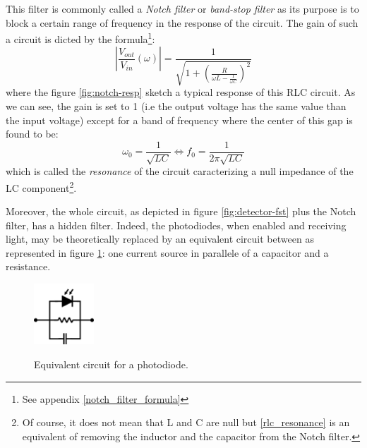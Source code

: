 \documentclass[11pt]{report}
\begin{document}
This filter is commonly called a \textit{Notch filter} or \textit{band-stop filter} as its purpose is to block a certain range of frequency in the response of the circuit. The gain of such a circuit is dicted by the formula\footnote{See appendix \ref{notch_filter_formula}}:
\begin{equation}
\left\lvert \frac{V_{out}}{V_{in}} (\omega) \right\rvert = \frac{1}{\sqrt{1 + \left(\frac{R}{\omega L - \frac{1}{\omega C}}\right)^2}}
\end{equation}
where the figure \ref{fig:notch-resp} sketch a typical response of this RLC circuit. As we can see, the gain is set to 1 (i.e the output voltage has the same value than the input voltage) except for a band of frequency where the center of this gap is found to be:
\begin{equation}
\label{rlc_resonance}
\omega_0 = \frac{1}{\sqrt{LC}} \Leftrightarrow f_0 = \frac{1}{2\pi\sqrt{LC}}
\end{equation}
which is called the \textit{resonance} of the circuit caracterizing a null impedance of the LC component\footnote{Of course, it does not mean that L and C are null but \eqref{rlc_resonance} is an equivalent of removing the inductor and the capacitor from the Notch filter.}.

Moreover, the whole circuit, as depicted in figure \ref{fig:detector-fst} plus the Notch filter, has a hidden filter. Indeed, the photodiodes, when enabled and receiving light, may be theoretically replaced by an equivalent circuit between as represented in figure \ref{fig:equiv-diode}: one current source in parallele of a capacitor and a resistance.

\begin{figure}[h!]
\caption{Equivalent circuit for a photodiode.}
\centering
\includegraphics[width=0.2\textwidth]{equiv-diode}
\label{fig:equiv-diode}
\end{figure}
\end{document}
